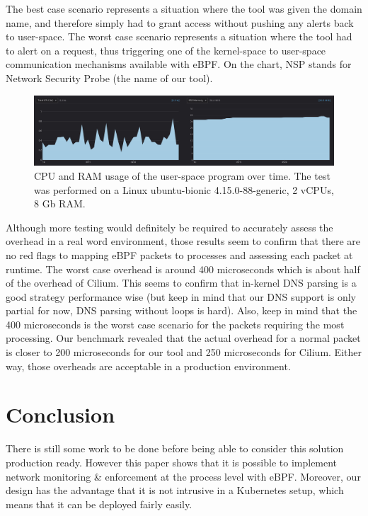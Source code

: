 The best case scenario represents a situation where the tool was given the domain name, and therefore simply had to grant access without pushing any alerts back to user-space. The worst case scenario represents a situation where the tool had to alert on a request, thus triggering one of the kernel-space to user-space communication mechanisms available with eBPF. On the chart, NSP stands for Network Security Probe (the name of our tool).

\begin{figure}[h]
  \centering
  \includegraphics[width=\textwidth]{ProcessLevelNetworkSecurityMonitoring/img/CPU-RAM.png}
  \caption*{CPU and RAM usage of the user-space program over time. The test was performed on a Linux ubuntu-bionic 4.15.0-88-generic, 2 vCPUs, 8 Gb RAM.}
  \label{fig:ProcessLevelNetworkSecurityMonitoring:CPU_RAM}
\end{figure}

Although more testing would definitely be required to accurately assess the overhead in a real word environment, those results seem to confirm that there are no red flags to mapping eBPF packets to processes and assessing each packet at runtime. The worst case overhead is around 400 microseconds which is about half of the overhead of Cilium. This seems to confirm that in-kernel DNS parsing is a good strategy performance wise (but keep in mind that our DNS support is only partial for now, DNS parsing without loops is hard). Also, keep in mind that the 400 microseconds is the worst case scenario for the packets requiring the most processing. Our benchmark revealed that the actual overhead for a normal packet is closer to 200 microseconds for our tool and 250 microseconds for Cilium. Either way, those overheads are acceptable in a production environment.

\section{Conclusion}

There is still some work to be done before being able to consider this solution production ready. However this paper shows that it is possible to implement network monitoring \& enforcement at the process level with eBPF. Moreover, our design has the advantage that it is not intrusive in a Kubernetes setup, which means that it can be deployed fairly easily.

